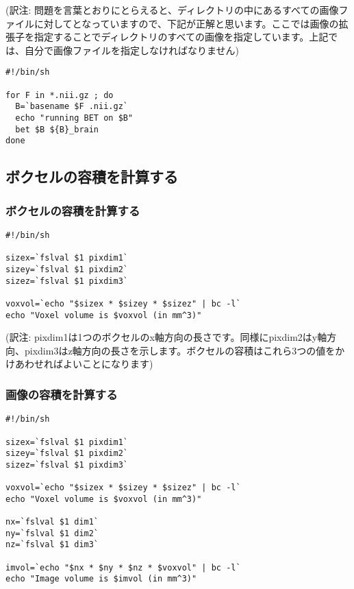 \documentclass{jsarticle}
\begin{document}
\noindent (訳注: 問題を言葉とおりにとらえると、ディレクトリの中にあるすべての画像ファイルに対してとなっていますので、下記が正解と思います。ここでは画像の拡張子を指定することでディレクトリのすべての画像を指定しています。上記では、自分で画像ファイルを指定しなければなりません)

\begin{verbatim}
#!/bin/sh

for F in *.nii.gz ; do  
  B=`basename $F .nii.gz`
  echo "running BET on $B"
  bet $B ${B}_brain
done
\end{verbatim}

\subsection{ボクセルの容積を計算する}

\subsubsection{ボクセルの容積を計算する}

\begin{verbatim}
#!/bin/sh

sizex=`fslval $1 pixdim1`
sizey=`fslval $1 pixdim2`
sizez=`fslval $1 pixdim3`

voxvol=`echo "$sizex * $sizey * $sizez" | bc -l` 
echo "Voxel volume is $voxvol (in mm^3)"
\end{verbatim}

\noindent (訳注: pixdim1は1つのボクセルのx軸方向の長さです。同様にpixdim2はy軸方向、pixdim3はz軸方向の長さを示します。ボクセルの容積はこれら3つの値をかけあわせればよいことになります)

\subsubsection{画像の容積を計算する}

\begin{verbatim}
#!/bin/sh

sizex=`fslval $1 pixdim1`
sizey=`fslval $1 pixdim2`
sizez=`fslval $1 pixdim3`

voxvol=`echo "$sizex * $sizey * $sizez" | bc -l` 
echo "Voxel volume is $voxvol (in mm^3)"

nx=`fslval $1 dim1`
ny=`fslval $1 dim2`
nz=`fslval $1 dim3`

imvol=`echo "$nx * $ny * $nz * $voxvol" | bc -l`
echo "Image volume is $imvol (in mm^3)"
\end{verbatim}
\end{document}
